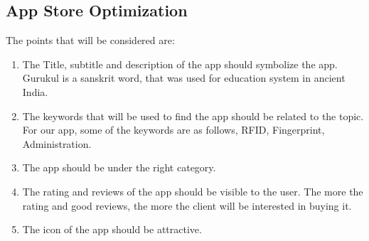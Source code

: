 \subsection{App Store Optimization}
\hspace{1cm} The points that will be considered are:
\begin{enumerate}
    \item The Title, subtitle and description of the app should symbolize the app. Gurukul is a sanskrit word, that was used for education system in ancient India.
    \item The keywords that will be used to find the app should be related to the topic. For our app, some of the keywords are as follows, RFID, Fingerprint, Administration.
    \item The app should be under the right category.
    \item The rating and reviews of the app should be visible to the user. The more the rating and good reviews, the more the client will be interested in buying it.
    \item The icon of the app should be attractive.
\end{enumerate}

